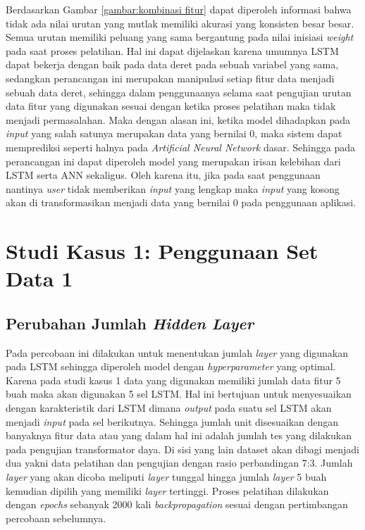 Berdasarkan Gambar \ref{gambar:kombinasi fitur} dapat diperoleh informasi bahwa tidak ada nilai urutan yang mutlak memiliki akurasi yang konsisten besar besar. Semua urutan memiliki peluang yang sama bergantung pada nilai inisiasi \textit{weight} pada saat proses pelatihan. Hal ini dapat dijelaskan karena umumnya LSTM dapat bekerja dengan baik pada data deret pada sebuah variabel yang sama, sedangkan perancangan ini merupakan manipulasi setiap fitur data menjadi sebuah data deret, sehingga dalam penggunaanya selama saat pengujian urutan data fitur yang digunakan sesuai dengan ketika proses pelatihan maka tidak menjadi permasalahan. Maka dengan alasan ini, ketika model dihadapkan pada \textit{input} yang salah satunya merupakan data yang bernilai 0, maka sistem dapat memprediksi seperti halnya pada \textit{Artificial Neural Network} dasar. Sehingga pada perancangan ini dapat diperoleh model yang merupakan irisan kelebihan dari LSTM serta ANN sekaligus. Oleh karena itu, jika pada saat penggunaan nantinya \textit{user} tidak memberikan \textit{input} yang lengkap maka \textit{input} yang kosong akan di transformasikan menjadi data yang bernilai 0 pada penggunaan aplikasi.
\section{Studi Kasus 1: Penggunaan Set Data 1}
\subsection{Perubahan Jumlah \textit{Hidden Layer}}
Pada percobaan ini dilakukan untuk menentukan jumlah \textit{layer} yang digunakan pada LSTM sehingga diperoleh model dengan \textit{hyperparameter }yang optimal. Karena pada studi kasus 1 data yang digunakan memiliki jumlah data fitur 5 buah maka akan digunakan 5 sel LSTM. Hal ini bertujuan untuk menyesuaikan dengan karakteristik dari LSTM dimana \textit{output} pada suatu sel LSTM akan menjadi \textit{input} pada sel berikutnya. Sehingga jumlah unit disesuaikan dengan banyaknya fitur data atau yang dalam hal ini adalah jumlah tes yang dilakukan pada pengujian transformator daya. Di sisi yang lain dataset akan dibagi menjadi dua yakni data pelatihan dan pengujian dengan rasio perbandingan 7:3. Jumlah \textit{layer} yang akan dicoba meliputi \textit{layer} tunggal hingga jumlah \textit{layer} 5 buah kemudian dipilih yang memiliki \textit{layer} tertinggi. Proses pelatihan dilakukan dengan \textit{epochs} sebanyak 2000 kali \textit{backpropagation} sesuai dengan pertimbangan percobaan sebelumnya.


